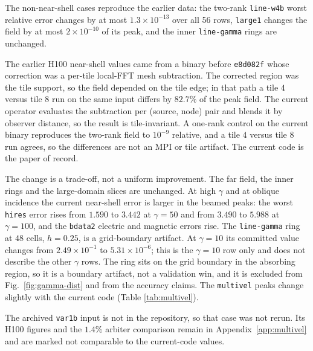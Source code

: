 The non-near-shell cases reproduce the earlier data: the two-rank
\texttt{line-w4b} worst relative error changes by at most
$1.3\times10^{-13}$ over all 56 rows, \texttt{large1} changes the field by at
most $2\times10^{-10}$ of its peak, and the inner \texttt{line-gamma} rings
are unchanged.

The earlier H100 near-shell values came from a binary before
\texttt{e8d082f} whose correction was a per-tile local-FFT mesh subtraction.
The corrected region was the tile support, so the field depended on the tile
edge; in that path a tile $4$ versus tile $8$ run on the same input differs by
$82.7\%$ of the peak field.  The current operator evaluates the subtraction per
(source, node) pair and blends it by observer distance, so the result is
tile-invariant.  A one-rank control on the current binary reproduces the
two-rank field to $10^{-9}$ relative, and a tile $4$ versus tile $8$ run
agrees, so the differences are not an MPI or tile artifact.  The current code
is the paper of record.

The change is a trade-off, not a uniform improvement.  The far field, the
inner rings and the large-domain slices are unchanged.  At high $\gamma$ and
at oblique incidence the current near-shell error is larger in the beamed
peaks: the worst \texttt{hires} error rises from $1.590$ to $3.442$ at
$\gamma=50$ and from $3.490$ to $5.988$ at $\gamma=100$, and the
\texttt{bdata2} electric and magnetic errors rise.  The \texttt{line-gamma}
ring at $48$ cells, $h=0.25$, is a grid-boundary artifact.  At $\gamma=10$
its committed value changes from $2.49\times10^{-1}$ to
$5.31\times10^{-6}$; this is the $\gamma=10$ row only and does not describe
the other $\gamma$ rows.  The ring sits on the grid boundary in the absorbing
region, so it is a boundary artifact, not a validation win, and it is excluded
from Fig.~\ref{fig:gamma-dist} and from the accuracy claims.  The
\texttt{multivel} peaks change slightly with the current code (Table
\ref{tab:multivel}).

The archived \texttt{var1b} input is not in the repository, so that case was
not rerun.  Its H100 figures and the $1.4\%$ arbiter comparison remain in
Appendix~\ref{app:multivel} and are marked not comparable to the current-code
values.

